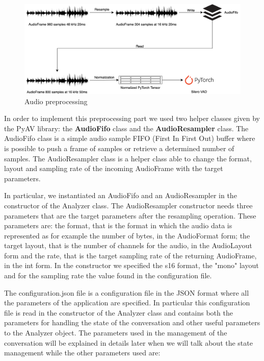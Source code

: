 \documentclass[../main.tex]{subfiles}
\begin{document}
\begin{figure}[ht]
    \centering
    \includegraphics[width=\textwidth]{images/Audio preprocessing2.png}
    \caption{Audio preprocessing}
    \label{fig:audio preprocessing}
\end{figure}

In order to implement this preprocessing part we used two helper classes given by the PyAV library: the \textbf{AudioFifo} class and the \textbf{AudioResampler} class. The AudioFifo class is a simple audio sample FIFO (First In First Out) buffer where is possible to push a frame of samples or retrieve a determined number of samples. The AudioResampler class is a helper class able to change the format, layout and sampling rate of the incoming AudioFrame with the target parameters. 

In particular, we instantiated an AudioFifo and an AudioResampler in the constructor of the Analyzer class. The AudioResampler constructor needs three parameters that are the target parameters after the resampling operation. These parameters are: the format, that is the format in which the audio data is represented as for example the number of bytes, in the AudioFormat form; the target layout, that is the number of channels for the audio, in the AudioLayout form and the rate, that is the target sampling rate of the returning AudioFrame, in the int form. In the constructor we specified the s16 format, the "mono" layout and for the sampling rate the value found in the configuration file. 

The configuration.json file is a configuration file in the JSON format where all the parameters of the application are specified. In particular this configuration file is read in the constructor of the Analyzer class and contains both the parameters for handling the state of the conversation and other useful parameters to the Analyzer object. The parameters used in the management of the conversation will be explained in details later when we will talk about the state management while the other parameters used are:
\end{document}
